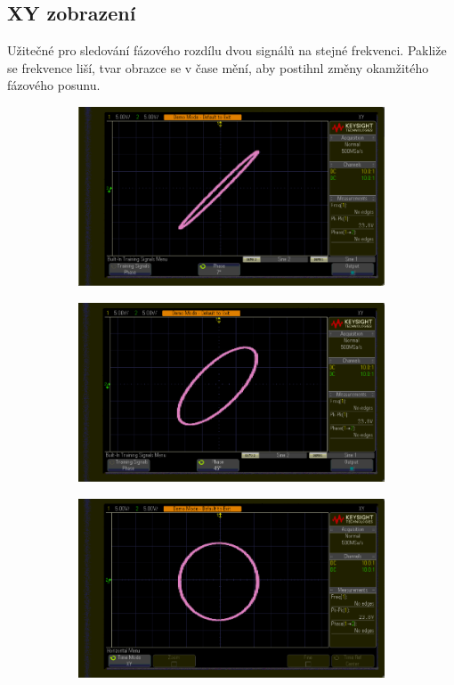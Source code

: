 \documentclass[twoside]{article}
\begin{document}
\subsection{XY zobrazení}
Užitečné pro sledování fázového rozdílu dvou signálů na stejné frekvenci.
Pakliže se frekvence liší, tvar obrazce se v čase mění, aby postihnl změny okamžitého fázového posunu.
\begin{figure}[htbp]
	\centering

	
	\begin{subfigure}{0.3\textwidth}
		\includegraphics[width=\linewidth]{xy_7deg.png}
	\end{subfigure}
	\begin{subfigure}{0.3\textwidth}
		\includegraphics[width=\linewidth]{xy_45deg.png}
	\end{subfigure}
	\begin{subfigure}{0.3\textwidth}
		\includegraphics[width=\linewidth]{xy_90deg.png}

\end{subfigure}
\end{figure}
\end{document}
